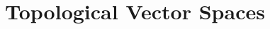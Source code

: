 \documentclass[working, oneside]{../Preambles/marginclass}
\begin{document}
\let\cleardoublepage\clearpage
\thispagestyle{fancy}
\chapter{Topological Vector Spaces}
\end{document}
